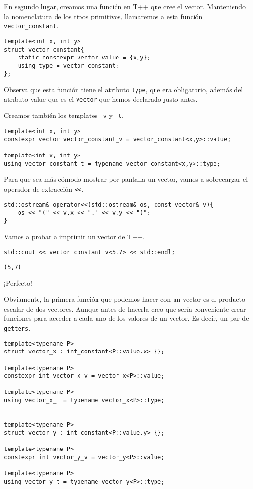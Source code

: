 \documentclass[11pt]{article}
\begin{document}
En segundo lugar, creamos una función en T++ que cree el vector. Manteniendo la nomenclatura de los tipos primitivos, llamaremos a esta función \texttt{vector\_constant}.

\begin{verbatim}
template<int x, int y>
struct vector_constant{
	static constexpr vector value = {x,y};
	using type = vector_constant;
};
\end{verbatim}

Observa que esta función tiene el atributo \texttt{type}, que era obligatorio, además del atributo value que es el \texttt{vector} que hemos declarado justo antes.

Creamos también los templates \texttt{\_v} y \texttt{\_t}.

\begin{verbatim}
template<int x, int y>
constexpr vector vector_constant_v = vector_constant<x,y>::value;

template<int x, int y>
using vector_constant_t = typename vector_constant<x,y>::type;
\end{verbatim}

Para que sea más cómodo mostrar por pantalla un vector, vamos a sobrecargar el operador de extracción \texttt{<<}.

\begin{verbatim}
std::ostream& operator<<(std::ostream& os, const vector& v){
	os << "(" << v.x << "," << v.y << ")";
}
\end{verbatim}

Vamos a probar a imprimir un vector de T++.

\begin{verbatim}
std::cout << vector_constant_v<5,7> << std::endl;
\end{verbatim}

\begin{verbatim}
(5,7)
\end{verbatim}


¡Perfecto!

Obviamente, la primera función que podemos hacer con un vector es el producto escalar de dos vectores. Aunque antes de hacerla creo que sería conveniente crear funciones para acceder a cada uno de los valores de un vector. Es decir, un par de \texttt{getters}.

\begin{verbatim}
template<typename P>
struct vector_x : int_constant<P::value.x> {};

template<typename P>
constexpr int vector_x_v = vector_x<P>::value;

template<typename P>
using vector_x_t = typename vector_x<P>::type;


template<typename P>
struct vector_y : int_constant<P::value.y> {};

template<typename P>
constexpr int vector_y_v = vector_y<P>::value;

template<typename P>
using vector_y_t = typename vector_y<P>::type;
\end{verbatim}
\end{document}
